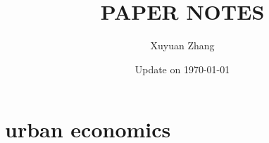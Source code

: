 \documentclass[11pt,twoside]{book}
\begin{document}
\title{\bf \huge PAPER NOTES}
\author{Xuyuan Zhang}
\date{Update on \today}
\maketitle
\setcounter{tocdepth}{2}
\setcounter{minitocdepth}{1} 

\begin{multicols}{2}
    \dominitoc%
    \adjustmtc[2]%
    \tableofcontents
    \label{toc-contents}
\end{multicols}


\begin{multicols}{2}
    \dominitoc%
    \adjustmtc[2]%
 \listoftheorems[ignoreall,show={theorem}]
\end{multicols}

\renewcommand{\listtheoremname}{List of Definitions}
\begin{multicols}{2}
	\listoftheorems[ignoreall,show={definition}]
\end{multicols}

	\printglossary


\part{urban economics}


% 








% 

% 

\backmatter


\printbibliography[heading=bibintoc]
\printindex
\end{document}
